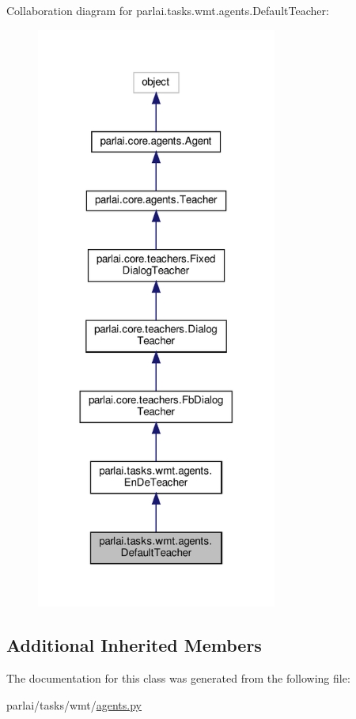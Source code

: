 Collaboration diagram for parlai.\+tasks.\+wmt.\+agents.\+Default\+Teacher\+:
\nopagebreak
\begin{figure}[H]
\begin{center}
\leavevmode
\includegraphics[width=224pt]{classparlai_1_1tasks_1_1wmt_1_1agents_1_1DefaultTeacher__coll__graph}
\end{center}
\end{figure}
\subsection*{Additional Inherited Members}


The documentation for this class was generated from the following file\+:\begin{DoxyCompactItemize}
\item 
parlai/tasks/wmt/\hyperlink{parlai_2tasks_2wmt_2agents_8py}{agents.\+py}\end{DoxyCompactItemize}
